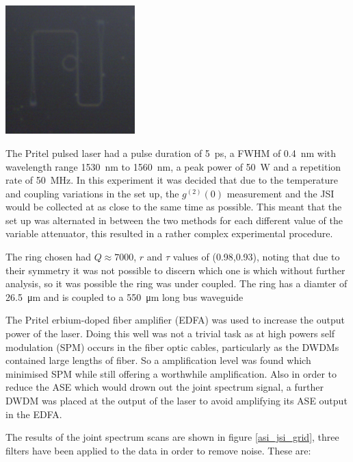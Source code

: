 \begingroup
    \centering  
    \includegraphics[width=5cm]{img/method/chipPictures/exampleASIRing.png}
     \vspace{3pt} \label{aSIChip}
\endgroup

The Pritel pulsed laser had a pulse duration of \SI{5}{\pico\second}, a FWHM of \SI{0.4}{\nano\meter} with wavelength range \SI{1530}{\nano\meter} to \SI{1560}{\nano\meter}, a peak power of \SI{50}{\watt} and a repetition rate of \SI{50}{\mega\hertz}. In this experiment it was decided that due to the temperature and coupling variations in the set up, the $g^{(2)}(0)$ measurement and the JSI would be collected at as close to the same time as possible. This meant that the set up was alternated in between the two methods for each different value of the variable attenuator, this resulted in a rather complex experimental procedure.

The ring chosen had $Q \approx 7000$, $r$ and $\tau$ values of (0.98,0.93), noting that due to their symmetry it was not possible to discern which one is which without further analysis, so it was possible the ring was under coupled. The ring has a diamter of \SI{26.5}{\micro\m} and is coupled to a \SI{550}{\micro\m} long bus waveguide

The Pritel erbium-doped fiber amplifier (EDFA) was used to increase the output power of the laser. Doing this well was not a trivial task as at high powers self modulation (SPM) occurs in the fiber optic cables, particularly as the DWDMs contained large lengths of fiber. So a amplification level was found which minimised SPM while still offering a worthwhile amplification. Also in order to reduce the ASE which would drown out the joint spectrum signal, a further DWDM was placed at the output of the laser to avoid amplifying its ASE output in the EDFA.

The results of the joint spectrum scans are shown in figure \ref{asi_jsi_grid}, three filters have been applied to the data in order to remove noise. These are:


